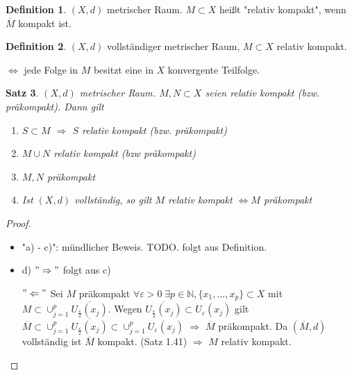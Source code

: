 \documentclass[ngerman]{report}
\theoremstyle{plain}%
\newtheorem{thm}{Satz}[chapter]
\theoremstyle{definition}%
\newtheorem{definition}[thm]{Definition}
\theoremstyle{myStyle}
\newcommand{\N}{\mathbb{N}}
\newcommand{\df}[1][]{%
	\overset{#1}{\Rightarrow}
}
\newcommand{\qmarks}[1]{"{}#1"{}}
\begin{document}
	\begin{definition}
		$(X,d)$ metrischer Raum. $M\subset X$ heißt \qmarks{relativ kompakt}, wenn $\overline{M}$ kompakt ist.
	\end{definition}

	\begin{definition}
		$(X,d)$ vollständiger metrischer Raum, $M \subset X$ relativ kompakt. \par
			$\Leftrightarrow$ jede Folge in $M$ besitzt eine in $X$ konvergente Teilfolge.
	\end{definition}

	\begin{thm}
		$(X,d)$ metrischer Raum. $M,N \subset X$ seien relativ kompakt (bzw. präkompakt). Dann gilt 
			\begin{enumerate}
				\item $S\subset M$ $\df$ $S$ relativ kompakt (bzw. präkompakt)
				\item $M\cup N$ relativ kompakt (bzw präkompakt)
				\item $M,N$ präkompakt
				\item Ist $(X,d)$ vollständig, so gilt $M$ relativ kompakt $\Leftrightarrow M$ präkompakt
			\end{enumerate}
	\end{thm}

	\begin{proof}
		\begin{itemize}[]
			\item \qmarks{a) - c)}: mündlicher Beweis. TODO. folgt aus Definition.
			\item d) $\qmarks{\df}$ folgt aus c) \par
				$\qmarks{\Leftarrow}$ Sei $M$ präkompakt $\forall \varepsilon > 0\; \exists p\in\N, \{x_1,\dots,x_p\} \subset X$ mit $M \subset \cup_{j=1}^p \overline{ U_{\frac{\varepsilon}{2}}(x_j)}$. 
				Wegen $\overline{U_{\frac{\varepsilon}{2}}(x_j)} \subset U_{{\varepsilon}}(x_j)$ gilt
				$\overline{M} \subset \cup_{j=1}^p \overline{U_{\frac{\varepsilon}{2}}(x_j)} \subset \cup_{j=1}^p U_{\varepsilon}(x_j)$
				$\df$ $\overline{M}$ präkompakt. Da $(\overline{M},d)$ vollständig ist $\overline{M}$ kompakt. (Satz 1.41) $\df$ $M$ relativ kompakt.

		\end{itemize}
	\end{proof}
\end{document}
